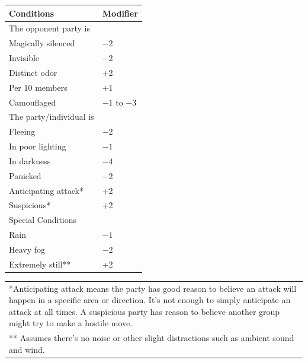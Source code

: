 \begin{multicols}{2}
\begin{minipage}{\columnwidth}
\label{surprisemodifiers}
\noindent
\begin{tabular}{|p{}|p{}|}
\hline
Conditions	& Modifier \\
\hline\hline
\rowcolor[gray]{.9}The opponent party is	& \\
\hspace{2em}Magically silenced	& $-2$ \\
\rowcolor[gray]{.9}\hspace{2em}Invisible	& $-2$ \\
\hspace{2em}Distinct odor	& +2 \\
\rowcolor[gray]{.9}\hspace{2em}Per 10 members	& +1 \\
\hspace{2em}Camouflaged	& $-1$ to $-3$ \\
\rowcolor[gray]{.9}The party/individual is	& \\
\rowcolor[gray]{.9}\hspace{2em}Fleeing	& $-2$ \\
\hspace{2em}In poor lighting	& $-1$ \\
\rowcolor[gray]{.9}\hspace{2em}In darkness	& $-4$ \\
\hspace{2em}Panicked	& $-2$ \\
\rowcolor[gray]{.9}\hspace{2em}Anticipating attack*	& +2 \\
\hspace{2em}Suspicious*	& +2 \\
\rowcolor[gray]{.9}Special Conditions	& \\
\rowcolor[gray]{.9}\hspace{2em}Rain	& $-1$ \\
\hspace{2em}Heavy fog	& $-2$ \\
\rowcolor[gray]{.9}\hspace{2em}Extremely still**	& +2 \\
\hline
\end{tabular}
\noindent\begin{tabular}{p{}}
*Anticipating attack means the party has good reason to believe an attack will happen in a specific area or direction. It's not enough to simply anticipate an attack at all times. A suspicious party has reason to believe another group might try to make a hostile move. \\
** Assumes there's no noise or other slight distractions such as ambient sound and wind. \\
\end{tabular}\vspace{.5em}


\end{minipage}
\end{multicols}
